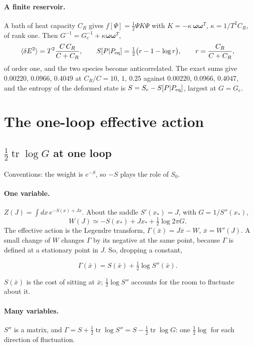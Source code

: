 \documentclass[11pt,aps,preprint,nofootinbib,superscriptaddress,tightenlines]{revtex4-2}
\newcommand{\avg}[1]{\langle #1\rangle}
\def\st{\begin{equation}}
\def\stp{\end{equation}}
\def\tr{\operatorname{tr}}
\let\oldparagraph\paragraph
\renewcommand{\paragraph}{\par\bigskip\oldparagraph}
\begin{document}
\paragraph{A finite reservoir.}  A bath of heat capacity $C_R$ gives $f[\Psi]=\tfrac12\Psi K\Psi$ with $K=-\kappa\,\bm\omega\bm\omega^T$,
$\kappa=1/T^2C_R$, of rank one.  Then $G^{-1}=G_e^{-1}+\kappa\bm\omega\bm\omega^T$,
\st
\avg{\delta E^2}=T^2\frac{C\,C_R}{C+C_R},\qquad S[P|P_{\rm eq}]=\tfrac12\big(r-1-\log r\big),\qquad r=\frac{C_R}{C+C_R},
\stp
of order one, and the two species become anticorrelated.  The exact sums give $0.00220$, $0.0966$, $0.4049$ at $C_R/C=10$, $1$, $0.25$ against
$0.00220$, $0.0966$, $0.4047$, and the entropy of the deformed state is $S=S_e-S[P|P_{\rm eq}]$, largest at $G=G_e$.

\section{The one-loop effective action}
\label{sec:oneloop}

\subsection{$\tfrac12\tr\log G$ at one loop}

Conventions: the weight is $e^{-S}$, so $-S$ plays the role of $S_0$.

\paragraph{One variable.}  $Z(J)=\int dx\,e^{-S(x)+Jx}$.  About the saddle $S'(x_*)=J$, with $G=1/S''(x_*)$,
\st
W(J)\simeq-S(x_*)+Jx_*+\tfrac12\log2\pi G .
\stp
The effective action is the Legendre transform, $\Gamma(\bar x)=J\bar x-W$, $\bar x=W'(J)$.  A small change of $W$ changes $\Gamma$ by its negative at
the same point, because $\Gamma$ is defined at a stationary point in $J$.  So, dropping a constant,
\begin{keyeq}
\st
\Gamma(\bar x)=S(\bar x)+\tfrac12\log S''(\bar x) .
\stp
\end{keyeq}
$S(\bar x)$ is the cost of sitting at $\bar x$; $\tfrac12\log S''$ accounts for the room to fluctuate about it.

\paragraph{Many variables.}  $S''$ is a matrix, and $\Gamma=S+\tfrac12\tr\log S''=S-\tfrac12\tr\log G$: one $\tfrac12\log$ for each direction of fluctuation.
\end{document}

